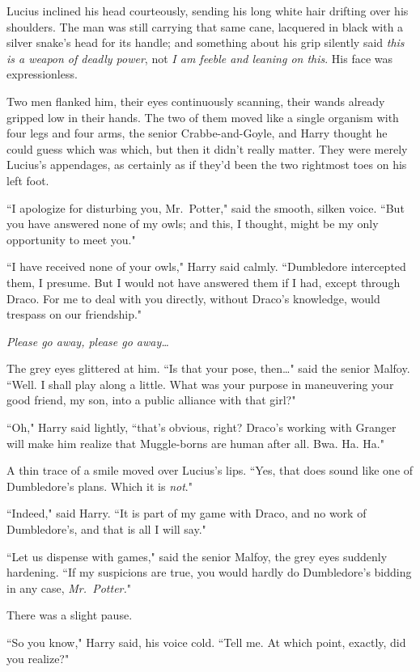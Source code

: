 Lucius inclined his head courteously, sending his long white hair drifting over his shoulders. The man was still carrying that same cane, lacquered in black with a silver snake's head for its handle; and something about his grip silently said \emph{this is a weapon of deadly power}, not \emph{I am feeble and leaning on this}. His face was expressionless.

Two men flanked him, their eyes continuously scanning, their wands already gripped low in their hands. The two of them moved like a single organism with four legs and four arms, the senior Crabbe-and-Goyle, and Harry thought he could guess which was which, but then it didn't really matter. They were merely Lucius's appendages, as certainly as if they'd been the two rightmost toes on his left foot.

``I apologize for disturbing you, Mr.~Potter," said the smooth, silken voice. ``But you have answered none of my owls; and this, I thought, might be my only opportunity to meet you."

``I have received none of your owls," Harry said calmly. ``Dumbledore intercepted them, I presume. But I would not have answered them if I had, except through Draco. For me to deal with you directly, without Draco's knowledge, would trespass on our friendship."

\emph{Please go away, please go away{\ldots}}

The grey eyes glittered at him. ``Is that your pose, then{\ldots}" said the senior Malfoy. ``Well. I shall play along a little. What was your purpose in maneuvering your good friend, my son, into a public alliance with that girl?"

``Oh," Harry said lightly, ``that's obvious, right? Draco's working with Granger will make him realize that Muggle-borns are human after all. Bwa. Ha. Ha."

A thin trace of a smile moved over Lucius's lips. ``Yes, that does sound like one of Dumbledore's plans. Which it is \emph{not}."

``Indeed," said Harry. ``It is part of my game with Draco, and no work of Dumbledore's, and that is all I will say."

``Let us dispense with games," said the senior Malfoy, the grey eyes suddenly hardening. ``If my suspicions are true, you would hardly do Dumbledore's bidding in any case, \emph{Mr.~Potter.}"

There was a slight pause.

``So you know," Harry said, his voice cold. ``Tell me. At which point, exactly, did you realize?"

